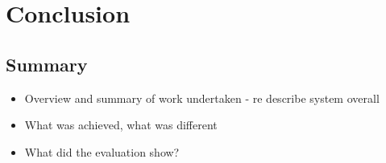 \documentclass[12pt,twoside,notitlepage]{report}
\begin{document}














\cleardoublepage
\chapter{Conclusion}
    \section{Summary}
        \begin{itemize}
            \item Overview and summary of work undertaken - re describe system overall
            \item What was achieved, what was different
            \item What did the evaluation show?
        \end{itemize}
\end{document}
